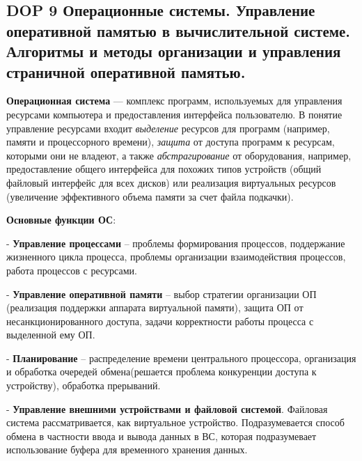 \subsection*{DOP 9 Операционные системы. Управление оперативной памятью в вычислительной системе. Алгоритмы и методы организации и управления страничной оперативной памятью.}

\textbf{Операционная система} --- комплекс программ, используемых для управления ресурсами компьютера и предоставления интерфейса пользователю.
В понятие управление ресурсами входит \textit{выделение} ресурсов для программ (например, памяти и процессорного времени),
\textit{защита} от доступа программ к ресурсам, которыми они не владеют, а также
\textit{абстрагирование} от оборудования, например, предоставление общего интерфейса для похожих типов устройств
(общий файловый интерфейс для всех дисков) или реализация виртуальных ресурсов (увеличение эффективного объема памяти за счет файла подкачки).



\textbf{Основные функции ОС}:

- \textbf{Управление процессами} -- проблемы формирования процессов, поддержание жизненного цикла процесса, проблемы организации взаимодействия процессов, работа процессов с ресурсами.

- \textbf{Управление оперативной памяти} -- выбор стратегии организации ОП (реализация поддержки аппарата виртуальной памяти), защита ОП от несанкционированного доступа, задачи корректности работы процесса с выделенной ему ОП.

- \textbf{Планирование} -- распределение времени центрального процессора, организация и обработка очередей обмена(решается проблема конкуренции доступа к устройству), обработка прерываний.

- \textbf{Управление внешними устройствами и файловой системой}. Файловая система рассматривается, как виртуальное устройство. Подразумевается способ обмена в частности ввода и вывода данных в ВС, которая подразумевает использование буфера для временного хранения данных.

